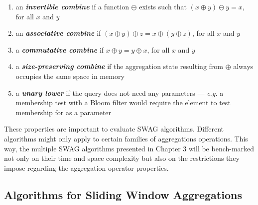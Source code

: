 \begin{enumerate}
    \item  an \textbf{\textit{invertible combine}} if a function $\ominus$ exists such that $(x \oplus y) \ominus y = x$, for all $x$ and $y$
    
    \item  an \textbf{\textit{associative combine}} if $(x \oplus y) \oplus z = x \oplus (y \oplus z)$, for all $x$ and $y$
    
    \item  a \textbf{\textit{commutative combine}} if $x \oplus y = y \oplus x$, for all $x$ and $y$
    
    \item  a \textbf{\textit{size-preserving combine}} if the aggregation state resulting from $\oplus$ always occupies the same space in memory
   
    \item  a \textbf{\textit{unary lower}} if the query does not need any parameters --- \textit{e.g.} a membership test with a Bloom filter would require the element to test membership for as a parameter
\end{enumerate}

These properties are important to evaluate SWAG algorithms. Different algorithms might only apply to certain families of aggregations operations. This way, the multiple SWAG algorithms presented in Chapter 3 will be bench-marked not only on their time and space complexity but also on the restrictions they impose regarding the aggregation operator properties.


\subsection{Algorithms for Sliding Window Aggregations}




